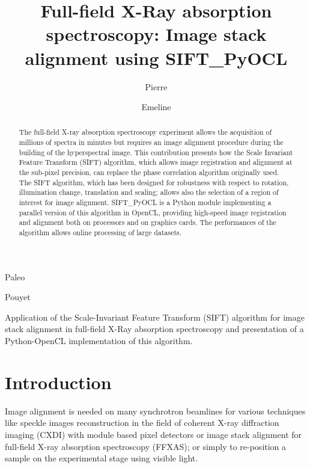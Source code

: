 \documentclass[preprint]{iucr}
\begin{document}
\title{Full-field X-Ray absorption spectroscopy: Image stack
alignment using SIFT\_PyOCL}

    \author[a]{Pierre}{Paleo}
    \author[a]{Emeline}{Pouyet}

\maketitle

\begin{synopsis}
Application of the Scale-Invariant Feature Transform (SIFT) algorithm for image
stack alignment in full-field X-Ray absorption spectroscopy and presentation of
a Python-OpenCL implementation of this algorithm.
\end{synopsis}

\begin{abstract}
The full-field X-ray absorption spectroscopy experiment allows the acquisition
of millions of spectra in minutes but requires an image alignment procedure during the
building of the hyperspectral image.
This contribution presents how the Scale Invariant Feature Transform (SIFT)
algorithm, which allows image registration and alignment at the sub-pixel
precision, can replace the phase correlation algorithm originally used.
The SIFT algorithm, which has been designed for robustness with respect to
rotation, illumination change, translation and scaling; allows also the
selection of a region of interest for image alignment.
SIFT\_PyOCL is a Python module implementing a parallel version of this algorithm
in OpenCL, providing high-speed image registration and alignment both on
processors and on graphics cards. The performances of the algorithm allows
online processing of large datasets.

\end{abstract}

\section{Introduction}

Image alignment is needed on many synchrotron beamlines for
various techniques like speckle images reconstruction in the field of coherent
X-ray diffraction imaging (CXDI) with module based pixel detectors or image
stack alignment for full-field X-ray absorption spectroscopy (FFXAS); or
simply to re-position a sample on the experimental stage using visible light.
\end{document}
